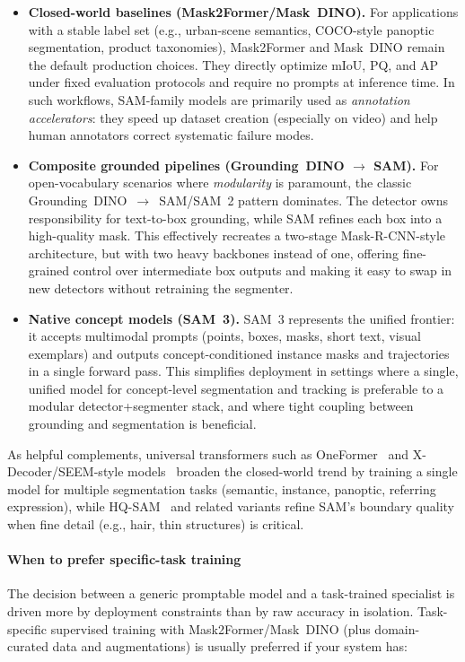 \begin{enrichment}
	\begin{itemize}
		\item \textbf{Closed-world baselines (Mask2Former/Mask~DINO).} For applications with a stable label set (e.g., urban-scene semantics, COCO-style panoptic segmentation, product taxonomies), Mask2Former and Mask~DINO remain the default production choices. They directly optimize mIoU, PQ, and AP under fixed evaluation protocols and require no prompts at inference time. In such workflows, SAM-family models are primarily used as \emph{annotation accelerators}: they speed up dataset creation (especially on video) and help human annotators correct systematic failure modes.
		\item \textbf{Composite grounded pipelines (Grounding~DINO $\to$ SAM).} For open-vocabulary scenarios where \emph{modularity} is paramount, the classic Grounding~DINO~$\to$~SAM/SAM~2 pattern dominates. The detector owns responsibility for text-to-box grounding, while SAM refines each box into a high-quality mask. This effectively recreates a two-stage Mask-R-CNN-style architecture, but with two heavy backbones instead of one, offering fine-grained control over intermediate box outputs and making it easy to swap in new detectors without retraining the segmenter.
		\item \textbf{Native concept models (SAM~3).} SAM~3 represents the unified frontier: it accepts multimodal prompts (points, boxes, masks, short text, visual exemplars) and outputs concept-conditioned instance masks and trajectories in a single forward pass. This simplifies deployment in settings where a single, unified model for concept-level segmentation and tracking is preferable to a modular detector+segmenter stack, and where tight coupling between grounding and segmentation is beneficial.
	\end{itemize}
	
	\newpage
	
	As helpful complements, universal transformers such as OneFormer~\cite{jain2023_oneformer} and X-Decoder/SEEM-style models~\cite{zou2022_xdecoder} broaden the closed-world trend by training a single model for multiple segmentation tasks (semantic, instance, panoptic, referring expression), while HQ-SAM~\cite{ke2023_hqsam} and related variants refine SAM’s boundary quality when fine detail (e.g., hair, thin structures) is critical.
	
	\paragraph{When to prefer specific-task training}
	The decision between a generic promptable model and a task-trained specialist is driven more by deployment constraints than by raw accuracy in isolation. Task-specific supervised training with Mask2Former/Mask~DINO (plus domain-curated data and augmentations) is usually preferred if your system has:
	

\end{enrichment}

